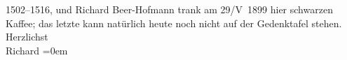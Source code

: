 \begin{ledgroupsized}[t]{13cm}
                  1502–1516, und Richard Beer-Hofmann trank am
                  29/V 1899 hier schwarzen Kaffee; das letzte kann natürlich heute noch
               nicht auf der Gedenktafel stehen.\pend
           \pstart
           Herzlichst{\\[\baselineskip]}\spacefill\mbox{Richard}\pend
           \leftskip=0em{}\endnumbering{}\end{ledgroupsized}  \newcommand{\dateiname}{L00919}\newcommand{\titel}{Richard Beer-Hofmann an Arthur Schnitzler, 29. 5. 1899}\newcommand{\editorInnen}{Martin Anton Müller und Gerd-Hermann Susen}
            \footnotesize
\begin{ledgroupsized}[t]{11.5cm}
\end{ledgroupsized}
         
      